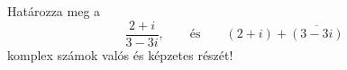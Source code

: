 \documentclass[11pt]{scrartcl}
\begin{document}
Határozza meg a
\[
	\frac{2 + i}{3 - 3i}, \qquad \text{és} \qquad
	(2 + i) + \overline{(3 - 3i)}
\]
komplex számok valós és képzetes részét!
\end{document}
